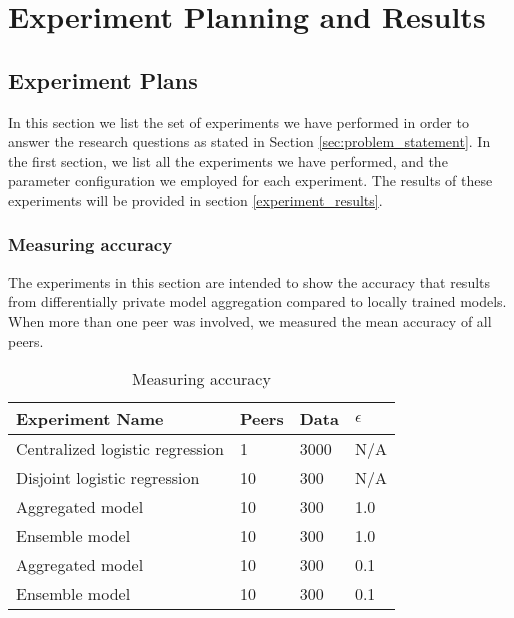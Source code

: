 
\chapter{Experiment Planning and Results}
\label{ch:experiments_and_results}

\section{Experiment Plans}
\label{sec:experiment_plan}

In this section we list the set of experiments we have performed in order to answer the research questions as stated in Section \ref{sec:problem_statement}. In the first section, we list all the experiments we have performed, and the parameter configuration we employed for each experiment. The results of these experiments will be provided in section \ref{experiment_results}.


\subsection{Measuring accuracy}
\label{sec:experiment_measuring_accuracy}
The experiments in this section are intended to show the accuracy that results from differentially private model aggregation compared to locally trained models. When more than one peer was involved, we measured the mean accuracy of all peers.

\begin{table}[h]
	\centering
	\begin{tabular}{|l|l|l|l|}
		{\bf Experiment Name}           & {\bf Peers} & {\bf Data} & {\bf $\epsilon$} \\
		\hline
		Centralized logistic regression & 1           & 3000       & N/A              \\	
		Disjoint logistic regression    & 10          & 300        & N/A              \\
		Aggregated model                & 10          & 300        & 1.0              \\
		Ensemble model                  & 10          & 300        & 1.0              \\
		Aggregated model                & 10          & 300        & 0.1              \\
		Ensemble model  & 10    & 300        & 0.1             
	\end{tabular}
	\caption{Measuring accuracy}
	\label{tab:experiment_accuracy_measuring}
\end{table}

